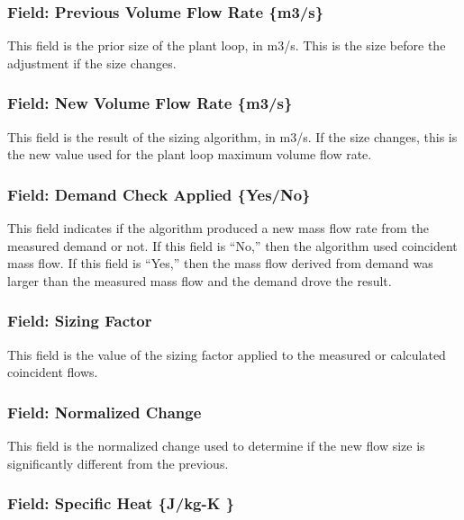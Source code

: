 \subsubsection{Field: Previous Volume Flow Rate \{m3/s\}}\label{field-previous-volume-flow-rate-m3s}

This field is the prior size of the plant loop, in m3/s. This is the size before the adjustment if the size changes.

\subsubsection{Field: New Volume Flow Rate \{m3/s\}}\label{field-new-volume-flow-rate-m3s}

This field is the result of the sizing algorithm, in m3/s. If the size changes, this is the new value used for the plant loop maximum volume flow rate.

\subsubsection{Field: Demand Check Applied \{Yes/No\}}\label{field-demand-check-applied-yesno}

This field indicates if the algorithm produced a new mass flow rate from the measured demand or not. If this field is ``No,'' then the algorithm used coincident mass flow. If this field is ``Yes,'' then the mass flow derived from demand was larger than the measured mass flow and the demand drove the result.

\subsubsection{Field: Sizing Factor}\label{field-sizing-factor}

This field is the value of the sizing factor applied to the measured or calculated coincident flows.

\subsubsection{Field: Normalized Change}\label{field-normalized-change}

This field is the normalized change used to determine if the new flow size is significantly different from the previous.

\subsubsection{Field: Specific Heat \{J/kg-K \}}\label{field-specific-heat-jkg-k}

